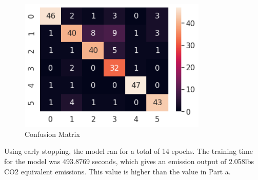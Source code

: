 \begin{figure}[H]
	\centering
	\includegraphics[width=0.8\textwidth]{images/q1/pb/matrix}
	\caption{Confusion Matrix}
	\label{fig:q1pbMatrix}
\end{figure}

Using early stopping, the model ran for a total of 14 epochs. The training time
for the model was 493.8769 seconds, which gives an emission output of 2.058lbs
CO2 equivalent emissions. This value is higher than the value in Part a.
